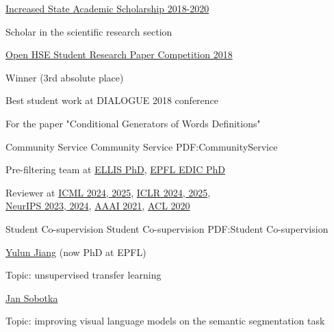 \documentclass[letterpaper,MMMyyyy,nonstopmode]{simpleresumecv}
\begin{document}
\begin{Body}
\Entry
\href{https://www.hse.ru/en/scholarships/academic_raised_demo}{Increased State Academic Scholarship 2018-2020}
\begin{Detail}
Scholar in the scientific research section
\end{Detail}
\Gap

\Entry
\href{https://nirs.hse.ru/nirs/}{Open HSE Student Research Paper Competition 2018}
\begin{Detail}
Winner (3rd absolute place)
\end{Detail}
\Gap

\Entry
Best student work at DIALOGUE 2018 conference
\begin{Detail}
For the paper "Conditional Generators of Words Definitions"
\end{Detail}

\newpage


\Section
{Community Service}
{Community Service}
{PDF:CommunityService}

\Entry
Pre-filtering team at \href{https://ellis.eu}{ELLIS PhD}, \href{https://www.epfl.ch/education/phd/edic-computer-and-communication-sciences/}{EPFL EDIC PhD}
\Gap

\Entry
Reviewer at \href{https://icml.cc}{ICML 2024, 2025}, \href{https://iclr.cc}{ICLR 2024, 2025}, \\
\href{https://neurips.cc}{NeurIPS 2023, 2024}, \href{https://aaai.org/Conferences/AAAI-21/}{AAAI 2021}, \href{https://acl2020.org}{ACL 2020}


\Section
{Student Co-supervision}
{Student Co-supervision}
{PDF:Student Co-supervision}

\Entry
\href{https://yljblues.github.io}{Yulun Jiang} (now PhD at EPFL)
\begin{Detail}
Topic: unsupervised transfer learning
\end{Detail}
\Gap

\Entry
\href{https://johnny1188.github.io}{Jan Sobotka}
\begin{Detail}
Topic: improving visual language models on the semantic segmentation task
\end{Detail}



\end{Body}
\end{document}
